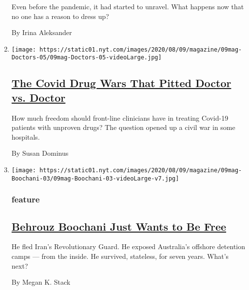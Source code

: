 \begin{enumerate}
  Even before the pandemic, it had started to unravel. What happens now
  that no one has a reason to dress up?

  By Irina Aleksander
\item
  \texttt{[image: https://static01.nyt.com/images/2020/08/09/magazine/09mag-Doctors-05/09mag-Doctors-05-videoLarge.jpg]}

  \hypertarget{the-covid-drug-wars-that-pitted-doctor-vs-doctor}{%
  \subsection{\texorpdfstring{\href{/2020/08/05/magazine/covid-drug-wars-doctors.html}{The
  Covid Drug Wars That Pitted Doctor vs.
  Doctor}}{The Covid Drug Wars That Pitted Doctor vs. Doctor}}\label{the-covid-drug-wars-that-pitted-doctor-vs-doctor}}

  How much freedom should front-line clinicians have in treating
  Covid-19 patients with unproven drugs? The question opened up a civil
  war in some hospitals.

  By Susan Dominus
\item
  \texttt{[image: https://static01.nyt.com/images/2020/08/09/magazine/09mag-Boochani-03/09mag-Boochani-03-videoLarge-v7.jpg]}

  \hypertarget{feature-1}{%
  \subsubsection{feature}\label{feature-1}}

  \hypertarget{behrouz-boochani-just-wants-to-be-free}{%
  \subsection{\texorpdfstring{\href{/2020/08/04/magazine/behrouz-boochani-australia.html}{Behrouz
  Boochani Just Wants to Be
  Free}}{Behrouz Boochani Just Wants to Be Free}}\label{behrouz-boochani-just-wants-to-be-free}}

  He fled Iran's Revolutionary Guard. He exposed Australia's offshore
  detention camps --- from the inside. He survived, stateless, for seven
  years. What's next?

  By Megan K. Stack
\end{enumerate}

